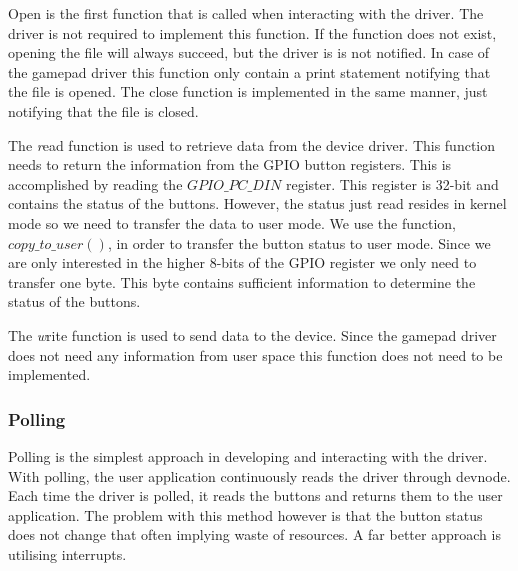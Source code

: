 Open is the first function that is called when interacting with the driver. The driver is not required to implement this function. If the function does not exist, opening the file will always succeed, but the driver is is not notified. In case of the gamepad driver this function only contain a print statement notifying that the file is opened. The close function is implemented in the same manner, just notifying that the file is closed. 

The \emph read function is used to retrieve data from the device driver. This function needs to return the information from the GPIO button registers. This is accomplished by reading the $GPIO\_PC\_DIN$ register. This register is 32-bit and contains the status of the buttons. However, the status just read resides in kernel mode so we need to transfer the data to user mode. We use the function, $copy\_to\_user()$, in order to transfer the button status to user mode. Since we are only interested in the higher 8-bits of the GPIO register we only need to transfer one byte. This byte contains sufficient information to determine the status of the buttons. 

The \emph write function is used to send data to the device. Since the gamepad driver does not need any information from user space this function does not need to be implemented. 






  



\subsubsection{Polling}
Polling is the simplest approach in developing and interacting with the driver. With polling, the user application continuously reads the driver through devnode. Each time the driver is polled, it reads the buttons and returns them to the user application. The problem with this method however is that the button status does not change that often implying waste of resources. A far better approach is utilising interrupts. 


